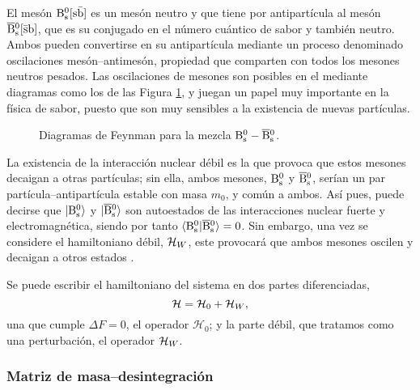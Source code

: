 El mesón $\text{B}{}_{\text{s}}^{0}[\mathrm{s\bar b}]$ es un mesón neutro y que tiene por antipartícula al mesón $\overline{\text{B}}{}_{\text{s}}^{0}[\mathrm{\bar s b}]$, que es su conjugado en el número cuántico de sabor y también neutro. Ambos pueden convertirse en su antipartícula mediante un proceso denominado oscilaciones mesón--antimesón, propiedad que comparten con todos los mesones neutros pesados. Las oscilaciones de mesones  son posibles en el \stdmod mediante diagramas como los de las Figura \ref{fig_mixing}, y juegan un papel muy importante en la física de sabor, puesto que son muy sensibles a la existencia de nuevas partículas. 

\begin{figure}[H]
\centering
{} \hfill
{} \hfill
\caption{Diagramas de Feynman para la mezcla $\text{B}{}_{\text{s}}^{0} - \overline{\text{B}}{}_{\text{s}}^{0}$.} \label{fig_mixing}
\end{figure}


La existencia de la interacción nuclear débil es la que provoca que estos mesones decaigan a otras partículas; sin ella, ambos mesones, $\text{B}{}_{\text{s}}^{0}$ y $\overline{\text{B}}{}_{\text{s}}^{0}$, serían un par partícula--antipartícula estable con masa $m_0$, y común a ambos. Así pues, puede decirse que $|\text{B}{}_{\text{s}}^{0}\rangle$ y $|\overline{\text{B}}{}_{\text{s}}^{0}\rangle$ son autoestados de las interacciones nuclear fuerte y electromagnética, siendo por tanto $\langle \text{B}{}_{\text{s}}^{0} | \overline{\text{B}}{}_{\text{s}}^{0} \rangle = 0$. Sin embargo, una vez se considere el hamiltoniano débil, $\mathcal{H}_{W}$, este provocará que ambos mesones oscilen y decaigan a otros estados \cite{lavoura}.

Se puede escribir el hamiltoniano del sistema en dos partes diferenciadas,
\[\mathcal{H} = \mathcal{H}_0 + \mathcal{H}_{W} ,\]
una que cumple $\Delta F =0$, el operador $\mathcal{H}_0$; y la parte débil, que tratamos como una perturbación, el operador $\mathcal{H}_{W}$.



\subsubsection{Matriz de masa--desintegración}

